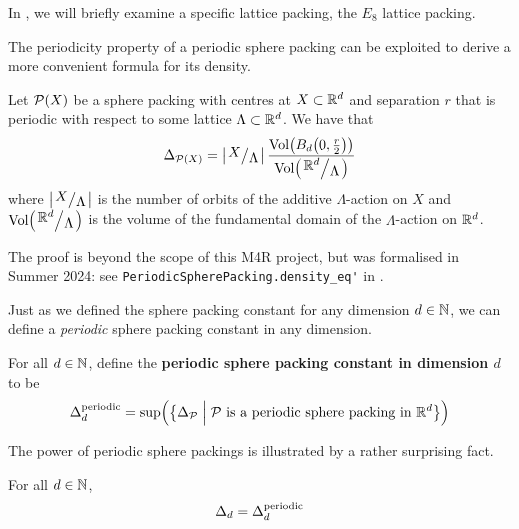 In , we will briefly examine a specific lattice packing, the $E_8$ lattice packing.

The periodicity property of a periodic sphere packing can be exploited to derive a more convenient formula for its density.

\begin{boxproposition}\label{Ch2:Prop:Periodic_Density}
    Let $\mathcal{P}(X)$ be a sphere packing with centres at $X \subset \mathbb{R}^d$ and separation $r$ that is periodic with respect to some lattice $\Lambda \subset \mathbb{R}^d$. We have that
    \begin{align}
        \Delta_{\Pa(X)} = \abs{\quotient{X}{\Lambda}} \frac{\Volof{B_d\of{0, \frac{r}{2}}}}{\Volof{\quotient{\R^d}{\Lambda}}}
        \label{Ch2:Eq:Periodic_Density}
    \end{align}
    where $\abs{\quotient{X}{\Lambda}}$ is the number of orbits of the additive $\Lambda$-action on $X$ and $\Volof{\quotient{\R^d}{\Lambda}}$ is the volume of the fundamental domain of the $\Lambda$-action on $\mathbb{R}^d$.
\end{boxproposition}

The proof is beyond the scope of this M4R project, but was formalised in Summer 2024: see \verb|PeriodicSpherePacking.density_eq'| in \cite[\texttt{SpherePacking.Basic.PeriodicPacking}]{documentation}.

Just as we defined the sphere packing constant for any dimension $d \in \mathbb{N}$, we can define a \textit{periodic} sphere packing constant in any dimension.

\begin{boxdefinition}
    For all $d \in \mathbb{N}$, define the \textbf{periodic sphere packing constant in dimension $d$} to be
    \begin{align*}
        \Delta_{d}^{\operatorname{periodic}} = \sup\!\left( {\left\{ \Delta_{\mathcal{P}} \; \middle\vert \; \mathcal{P} \text{ is a periodic sphere packing in } \mathbb{R}^d \right\}} \right)
    \end{align*}
\end{boxdefinition}

The power of periodic sphere packings is illustrated by a rather surprising fact.

\begin{boxproposition}\label{Ch2:Prop:Periodic_Const_eq_Const}
    For all $d \in \mathbb{N}$,
    \begin{align*}
        \Delta_{d} = \Delta_{d}^{\operatorname{periodic}}
    \end{align*}
\end{boxproposition}

